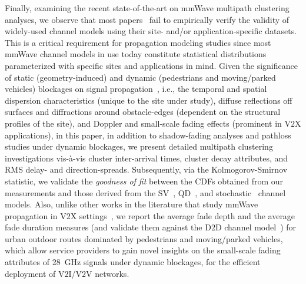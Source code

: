 \documentclass[12pt, draftcls, onecolumn]{IEEEtran}
\begin{document}
Finally, examining the recent state-of-the-art on mmWave multipath clustering analyses, we observe that most papers~\cite{Outdoor28G, PDAPs, D2DHumanBlockage, DopplerHST, V2XBlockages, MacCartneyUrbanHumanBlockage} fail to empirically verify the validity of widely-used channel models using their site- and/or application-specific datasets. This is a critical requirement for propagation modeling studies since most mmWave channel models in use today constitute statistical distributions parameterized with specific sites and applications in mind. Given the significance of static (geometry-induced) and dynamic (pedestrians and moving/parked vehicles) blockages on signal propagation~\cite{Rappaport}, i.e., the temporal and spatial dispersion characteristics (unique to the site under study), diffuse reflections off surfaces and diffractions around obstacle-edges (dependent on the structural profiles of the site), and Doppler and small-scale fading effects (prominent in V$2$X applications), in this paper, in addition to shadow-fading analyses and pathloss studies under dynamic blockages, we present detailed multipath clustering investigations vis-\`{a}-vis cluster inter-arrival times, cluster decay attributes, and RMS delay- and direction-spreads. Subsequently, via the Kolmogorov-Smirnov statistic, we validate the \emph{goodness of fit} between the CDFs obtained from our measurements and those derived from the SV~\cite{SV_Molisch}, QD~\cite{QDC_NIST}, and stochastic~\cite{Indoor60G} channel models. Also, unlike other works in the literature that study mmWave propagation in V$2$X settings~\cite{DopplerHST, V2XBlockages, MacCartneyUrbanHumanBlockage}, we report the average fade depth and the average fade duration measures (and validate them against the D$2$D channel model~\cite{D2DHumanBlockage}) for urban outdoor routes dominated by pedestrians and moving/parked vehicles, which allow service providers to gain novel insights on the small-scale fading attributes of \SI{28}{\giga\hertz} signals under dynamic blockages, for the efficient deployment of V$2$I/V$2$V networks.
\end{document}
